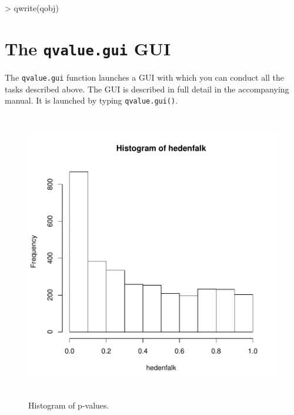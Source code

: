 \documentclass[11pt]{article}
\newcommand{\Rfunction}[1]{{\texttt{#1}}}
\begin{document}
\begin{Schunk}
\begin{Sinput}
> qwrite(qobj)
\end{Sinput}
\end{Schunk}

\section{The \Rfunction{qvalue.gui} GUI}

The \Rfunction{qvalue.gui} function launches a GUI with which you can conduct all the tasks described above.  
The GUI is described in full detail in the accompanying manual.  It is launched by typing 
\texttt{qvalue.gui()}.

 

\begin{figure}[ht]
  \begin{center}
    \includegraphics[width=5in,height=5in]{pHist}
  \end{center}
  \caption{Histogram of p-values.}
\end{figure}
\end{document}
